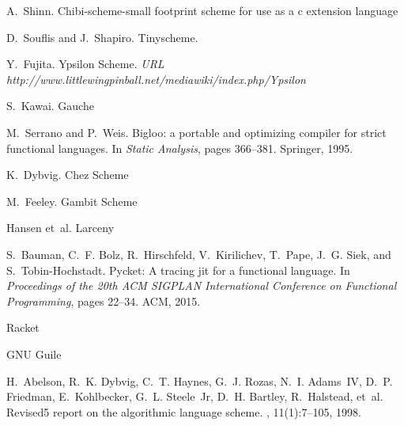 \documentclass[preprint, numbers]{sigplanconf}
\begin{document}



\begin{thebibliography}{}
  \softraggedright

 A.~Shinn.  \newblock Chibi-scheme-small footprint
  scheme for use as a c extension language 

 D.~Souflis and J.~Shapiro.  \newblock
  Tinyscheme.  

 Y.~Fujita.  \newblock Ypsilon Scheme. \newblock
  {\em URL http://www.littlewingpinball.net/mediawiki/index.php/Ypsilon}

 S.~Kawai. \newblock Gauche 

M.~Serrano and P.~Weis.
\newblock Bigloo: a portable and optimizing compiler for strict functional
  languages.
\newblock In {\em Static Analysis}, pages 366--381. Springer, 1995.

 K.~Dybvig. \newblock Chez Scheme

 M.~Feeley. \newblock Gambit Scheme

 Hansen et~al. \newblock Larceny

 S.~Bauman,
  C.~F. Bolz, R.~Hirschfeld, V.~Kirilichev, T.~Pape, J.~G. Siek, and
  S.~Tobin-Hochstadt.  \newblock Pycket: A tracing jit for a functional
  language.  \newblock In {\em Proceedings of the 20th ACM SIGPLAN
    International Conference on Functional Programming}, pages 22--34. ACM,
  2015.

 \newblock Racket 

 \newblock GNU Guile

H.~Abelson, R.~K. Dybvig, C.~T. Haynes, G.~J. Rozas, N.~I. Adams~IV, D.~P.
  Friedman, E.~Kohlbecker, G.~L. Steele~Jr, D.~H. Bartley, R.~Halstead, et~al.
\newblock Revised5 report on the algorithmic language scheme.
, 11(1):7--105, 1998.


\end{thebibliography}
\end{document}
